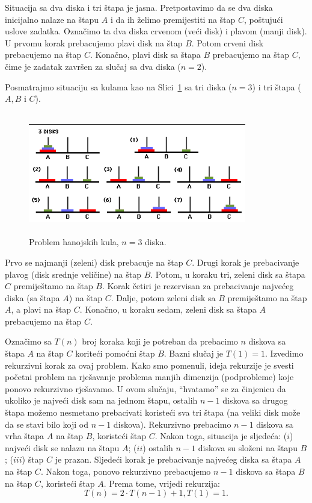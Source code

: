 \begin{solution}
 
 
 	Situacija sa dva diska i tri štapa je jasna. Pretpostavimo da se dva diska inicijalno nalaze na štapu $A$ i da ih želimo premijestiti na štap $C$, poštujući uslove zadatka. Označimo ta dva diska crvenom (veći disk) i plavom (manji disk). U prvomu korak prebacujemo plavi disk na štap $B$. Potom crveni disk prebacujemo na štap $C$. Konačno, plavi disk sa štapa $B$ prebacujemo na štap $C$, čime je zadatak završen za slučaj sa dva diska ($n=2$).
 	
 	Posmatrajmo situaciju sa kulama kao na Slici~\ref{fig:tower} sa tri diska ($n=3$) i tri štapa ($A, B$ i $C$). 
 	
 	\begin{figure}[H]
 		\centering
 		\includegraphics[width=270pt,height=150pt]{slike/tower.png}


 	 \caption{Problem hanojskih kula, $n=3$ diska.}     \label{fig:tower}
 	 	\end{figure}

 Prvo se najmanji (zeleni) disk prebacuje na štap $C$. Drugi korak je prebacivanje plavog (disk srednje veličine) na štap $B$. Potom, u koraku tri, zeleni disk sa štapa $C$ premiještamo na štap $B$. Korak četiri je rezervisan za prebacivanje najvećeg diska (sa štapa $A$)  na štap $C$. Dalje, potom zeleni disk sa $B$ premiještamo na štap $A$, a plavi na štap $C$. Konačno, u koraku sedam, zeleni disk sa štapa $A$ prebacujemo na štap $C$.  
 
Označimo sa $T(n)$ broj koraka koji je potreban da prebacimo $n$ diskova sa štapa $A$ na štap $C$ koriteći pomoćni štap $B$. Bazni slučaj je $T(1) = 1$. Izvedimo rekurzivni korak za ovaj problem. Kako smo pomenuli, ideja rekurzije je svesti početni problem na rješavanje problema manjih dimenzija (podprobleme) koje ponovo   rekurzivno rješavamo. U ovom slučaju, ``hvatamo'' se za činjenicu da ukoliko je najveći disk sam na jednom štapu, ostalih $n-1$ diskova sa drugog štapa možemo nesmetano prebacivati koristeći sva tri štapa (na veliki disk može da se stavi bilo koji od $n-1$ diskova). Rekurzivno prebacimo $n-1$ diskova sa vrha štapa $A$ na štap $B$, koristeći štap $C$. Nakon toga, situacija je  sljedeća: ($i$) najveći disk se nalazu na štapu $A$; ($ii$) ostalih $n-1$ diskova su složeni na štapu $B$; ($iii$) štap $C$ je prazan. Sljedeći korak je prebacivanje najvećeg diska sa štapa $A$ na štap $C$. Nakon toga, ponovo rekurzivno prebacujemo $n-1$ diskova sa štapa $B$ na štap $C$, koristeći štap $A$. Prema tome, vrijedi rekurzija:
$$ T(n) = 2 \cdot T(n-1) + 1, T(1) = 1.$$
 

\end{solution}
